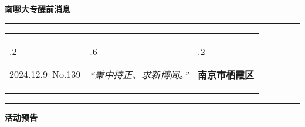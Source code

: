 \documentclass[letterpaper, 12pt]{article}
\begin{document}
\begin{center}
    \Huge\textbf{南哪大专醒前消息}
\end{center}
\vspace{4mm}
\hrule
\renewcommand\tabularxcolumn[1]{m{#1}}
\begin{tabularx}{\textwidth}{>{\hsize.2\hsize}X>{\hsize.6\hsize}X>{\hsize.2\hsize}X}
    \begin{flushleft}
        2024.12.9\, No.139
    \end{flushleft}
    &
    \begin{center}
        \textit{“秉中持正、求新博闻。”}
    \end{center}
    &
    \begin{flushright}
        \textbf{南京市栖霞区}
    \end{flushright}
\end{tabularx}
\vspace{-3.5mm}
\hrule
\vspace{4mm}
\centerline{\huge\textbf{活动预告}}
\end{document}

